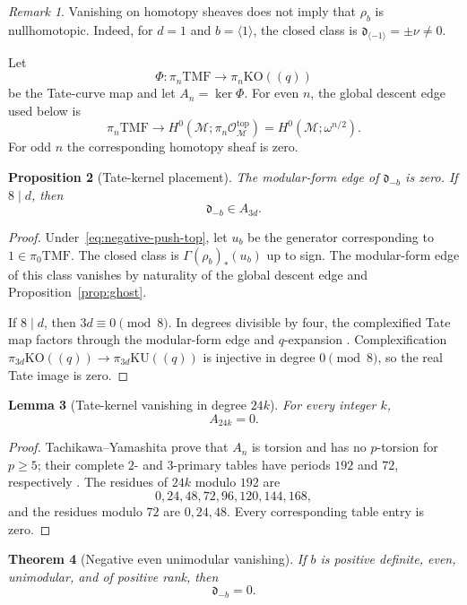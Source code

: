 \documentclass[11pt,a4paper]{amsart}
\newcommand{\TMF}{\mathrm{TMF}}
\newcommand{\KO}{\mathrm{KO}}
\newcommand{\KU}{\mathrm{KU}}
\newcommand{\cM}{\mathcal M}
\newcommand{\cO}{\mathcal O}
\newcommand{\dclass}{\mathfrak d}
\theoremstyle{plain}
\newtheorem{theorem}{Theorem}[section]
\newtheorem{proposition}[theorem]{Proposition}
\newtheorem{lemma}[theorem]{Lemma}
\theoremstyle{definition}
\theoremstyle{remark}
\newtheorem{remark}[theorem]{Remark}
\begin{document}
\begin{remark}
Vanishing on homotopy sheaves does not imply that $\rho_b$ is
nullhomotopic. Indeed, for $d=1$ and $b=\langle1\rangle$, the
closed class is $\dclass_{\langle-1\rangle}=\pm\nu\ne0$.
\end{remark}

Let
\[
 \Phi:\pi_n\TMF\longrightarrow\pi_n\KO((q))
\]
be the Tate-curve map and let $A_n=\ker\Phi$.
For even $n$, the global descent edge used below is
\[
 \pi_n\TMF\longrightarrow
 H^0(\cM;\pi_n\cO_{\cM}^{\mathrm{top}})
   =H^0(\cM;\omega^{n/2}).
\]
For odd $n$ the corresponding homotopy sheaf is zero.

\begin{proposition}[Tate-kernel placement]\label{prop:tate-placement}
The modular-form edge of $\dclass_{-b}$ is zero. If $8\mid d$, then
\[
 \dclass_{-b}\in A_{3d}.
\]
\end{proposition}

\begin{proof}
Under~\eqref{eq:negative-push-top}, let $u_b$ be the generator
corresponding to $1\in\pi_0\TMF$. The closed class is
$\Gamma(\rho_b)_*(u_b)$ up to sign. The modular-form edge of this
class vanishes by naturality of the global descent edge and
Proposition~\ref{prop:ghost}.

If $8\mid d$, then $3d\equiv0\pmod8$. In degrees divisible by
four, the complexified Tate map factors through the modular-form
edge and $q$-expansion \cite[Appendix~C]{TY}.
Complexification $\pi_{3d}\KO((q))\to\pi_{3d}\KU((q))$ is
injective in degree $0\pmod8$, so the real Tate image is zero.
\end{proof}

\begin{lemma}[Tate-kernel vanishing in degree $24k$]\label{lem:A24}
For every integer $k$,
\[
 A_{24k}=0.
\]
\end{lemma}

\begin{proof}
Tachikawa--Yamashita prove that $A_n$ is torsion and has no
$p$-torsion for $p\ge5$; their complete $2$- and $3$-primary tables
have periods $192$ and $72$, respectively \cite[Appendix~C]{TY}.
The residues of $24k$ modulo $192$ are
\[
 0,24,48,72,96,120,144,168,
\]
and the residues modulo $72$ are $0,24,48$. Every corresponding
table entry is zero.
\end{proof}

\begin{theorem}[Negative even unimodular vanishing]\label{thm:negative-even}
If $b$ is positive definite, even, unimodular, and of positive
rank, then
\begin{equation}\label{eq:negative-even}
 \boxed{\dclass_{-b}=0.}
\end{equation}
\end{theorem}
\end{document}
